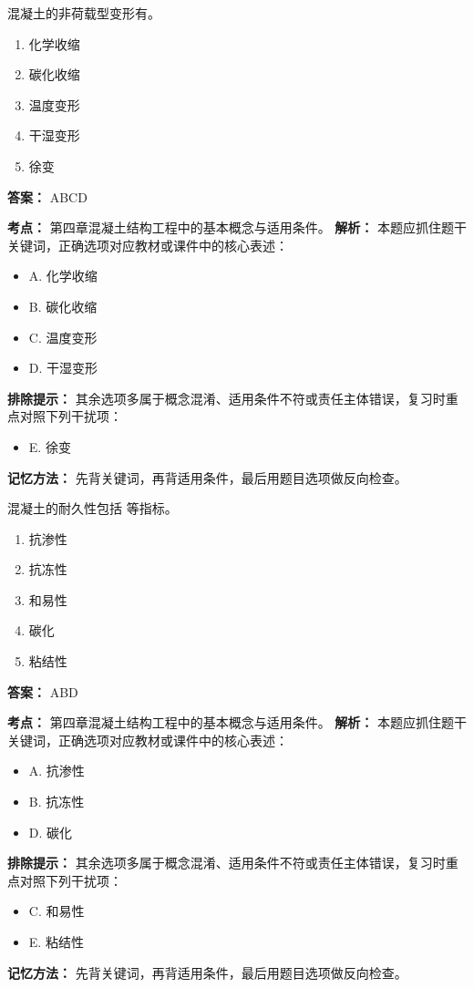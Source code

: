 \documentclass[UTF8,fontset=fandol,11pt]{ctexart}
\begin{document}
\begin{quizbox}[title={第 63 题}]
混凝土的非荷载型变形有。\\
\begin{enumerate}[label=\Alph*.]
\item 化学收缩
\item 碳化收缩
\item 温度变形
\item 干湿变形
\item 徐变
\end{enumerate}
\textbf{答案：} ABCD
\vspace{0.25em}
\begin{answerbox}[title={考点解析}]
\textbf{考点：} 第四章混凝土结构工程中的基本概念与适用条件。
\textbf{解析：} 本题应抓住题干关键词，正确选项对应教材或课件中的核心表述：
\begin{itemize}
\item A. 化学收缩
\item B. 碳化收缩
\item C. 温度变形
\item D. 干湿变形
\end{itemize}
\textbf{排除提示：} 其余选项多属于概念混淆、适用条件不符或责任主体错误，复习时重点对照下列干扰项：
\begin{itemize}
\item E. 徐变
\end{itemize}
\textbf{记忆方法：} 先背关键词，再背适用条件，最后用题目选项做反向检查。
\end{answerbox}
\end{quizbox}

\vspace{0.2em}

\begin{quizbox}[title={第 64 题}]
混凝土的耐久性包括 等指标。\\
\begin{enumerate}[label=\Alph*.]
\item 抗渗性
\item 抗冻性
\item 和易性
\item 碳化
\item 粘结性
\end{enumerate}
\textbf{答案：} ABD
\vspace{0.25em}
\begin{answerbox}[title={考点解析}]
\textbf{考点：} 第四章混凝土结构工程中的基本概念与适用条件。
\textbf{解析：} 本题应抓住题干关键词，正确选项对应教材或课件中的核心表述：
\begin{itemize}
\item A. 抗渗性
\item B. 抗冻性
\item D. 碳化
\end{itemize}
\textbf{排除提示：} 其余选项多属于概念混淆、适用条件不符或责任主体错误，复习时重点对照下列干扰项：
\begin{itemize}
\item C. 和易性
\item E. 粘结性
\end{itemize}
\textbf{记忆方法：} 先背关键词，再背适用条件，最后用题目选项做反向检查。
\end{answerbox}
\end{quizbox}
\end{document}
